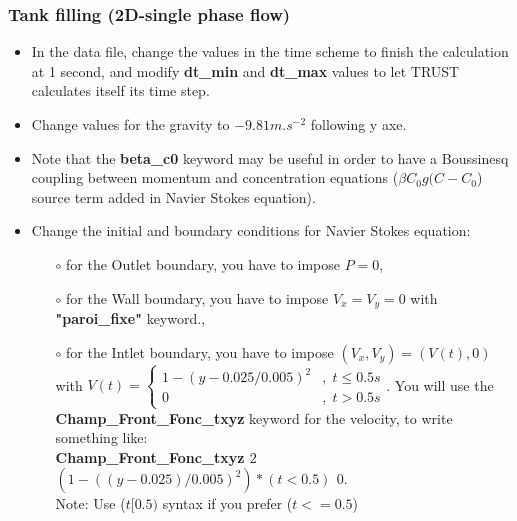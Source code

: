\documentclass[10pt]{beamer}
\begin{document}
\begin{frame}
\frametitle{Tank filling (2D-single phase flow)}
\begin{block}{}

\begin{itemize}
\item In the data file, change the values in the time scheme to finish the calculation at 1
second, and modify \textbf{dt\_min} and \textbf{dt\_max} values to let TRUST calculates itself its
time step.

\item Change values for the gravity to $-9.81 m.s^{-2}$ following y axe.

\item Note that the \textbf{beta\_c0} keyword may be useful in order to have a Boussinesq coupling between momentum and concentration equations ($\beta C_0 g(C-C_0$) source term added in Navier Stokes equation).

\item Change the initial and boundary conditions for Navier Stokes equation:
    \begin{itemize}
    \item [$\circ$] for the Outlet boundary, you have to impose $P=0$,
    \item [$\circ$] for the Wall boundary, you have to impose $V_x=V_y=0$ with \textbf{"paroi\_fixe"} keyword.,
    \item [$\circ$] for the Intlet boundary, you have to impose $(V_{x},V_{y})=(V(t),0)$ with 
    $V(t)=  
    \begin{cases}  
    1-(y-0.025/0.005)^{2} & ,\; t\leq0.5s\\
    0 & ,\; t>0.5s
    \end{cases}
    $. You will use the \textbf{Champ\_Front\_Fonc\_txyz} keyword for the velocity, to write something like: \\
    \textbf{Champ\_Front\_Fonc\_txyz $2$ $(1-((y-0.025)/0.005)^2)*(t<0.5)$ $0.$}\\
    Note: Use ($t[0.5)$ syntax if you prefer ($t<=0.5$)
    \end{itemize}
\end{itemize}

\end{block}
\end{frame}
\end{document}
